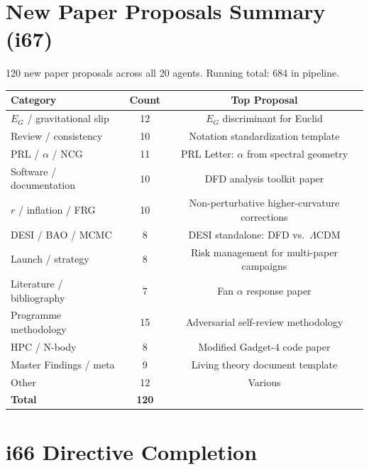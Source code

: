 \documentclass[11pt,a4paper]{article}
\begin{document}
\section{New Paper Proposals Summary (i67)}
\label{sec:papers}

120 new paper proposals across all 20 agents. Running total: 684 in pipeline.

\begin{center}
\begin{tabular}{lcc}
\toprule
\textbf{Category} & \textbf{Count} & \textbf{Top Proposal} \\
\midrule
$E_G$ / gravitational slip & 12 & $E_G$ discriminant for Euclid \\
Review / consistency & 10 & Notation standardization template \\
PRL / $\alpha$ / NCG & 11 & PRL Letter: $\alpha$ from spectral geometry \\
Software / documentation & 10 & DFD analysis toolkit paper \\
$r$ / inflation / FRG & 10 & Non-perturbative higher-curvature corrections \\
DESI / BAO / MCMC & 8 & DESI standalone: DFD vs.\ $\Lambda$CDM \\
Launch / strategy & 8 & Risk management for multi-paper campaigns \\
Literature / bibliography & 7 & Fan $\alpha$ response paper \\
Programme methodology & 15 & Adversarial self-review methodology \\
HPC / N-body & 8 & Modified Gadget-4 code paper \\
Master Findings / meta & 9 & Living theory document template \\
Other & 12 & Various \\
\midrule
\textbf{Total} & \textbf{120} & \\
\bottomrule
\end{tabular}
\end{center}


\section{i66 Directive Completion}
\label{sec:directives-completion}
\end{document}
